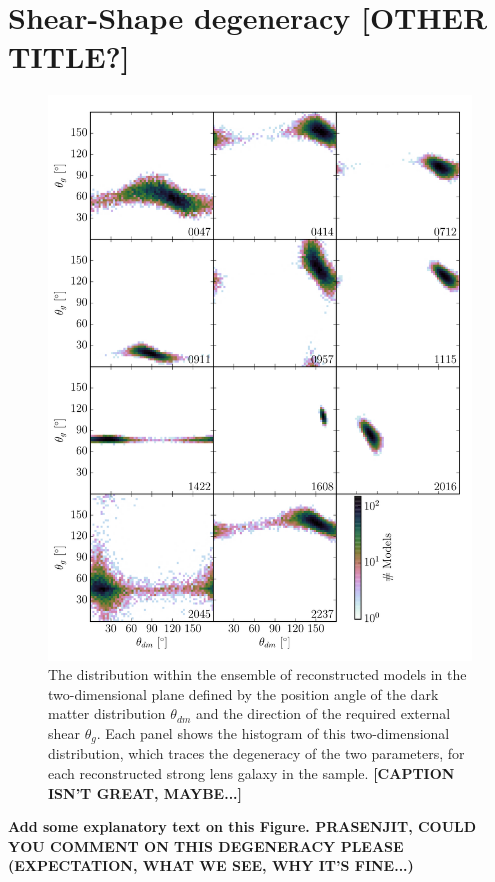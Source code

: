\documentclass[useAMS,usenatbib]{mn2e}
\begin{document}
\section{Shear-Shape degeneracy [OTHER TITLE?]}\label{sec:shearshapedeg}
\begin{figure}
  \centering
  \includegraphics[width=.9\linewidth]{Figures/theta_scatter.pdf}
  \caption[width=\linewidth]{The distribution within the ensemble of reconstructed models in the two-dimensional plane defined by the position angle of the dark matter distribution $\theta_{dm}$ and the direction of the required external shear $\theta_{g}$. Each panel shows the histogram of this two-dimensional distribution, which traces the degeneracy of the two parameters, for each reconstructed strong lens galaxy in the sample. \textbf{[CAPTION ISN'T GREAT, MAYBE...]}}
  \label{fig:thetascatter}
\end{figure}

\textbf{Add some explanatory text on this Figure. PRASENJIT, COULD YOU COMMENT ON THIS DEGENERACY PLEASE (EXPECTATION, WHAT WE SEE, WHY IT'S FINE...)}
\end{document}
